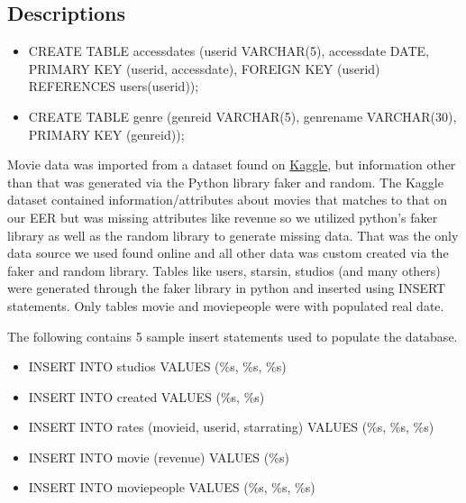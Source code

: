 \documentclass[12pt]{article}
\begin{document}

\subsection{Descriptions}

\begin{itemize}
    \item CREATE TABLE accessdates (userid VARCHAR(5), accessdate DATE, PRIMARY KEY (userid, accessdate), FOREIGN KEY (userid) REFERENCES users(userid));
    \item CREATE TABLE genre (genreid VARCHAR(5), genrename VARCHAR(30), PRIMARY KEY (genreid));
\end{itemize}



Movie data was imported from a dataset found on \href{https://www.kaggle.com/datasets/shivamb/netflix-shows}{Kaggle}, but information other than that was generated via the Python library faker and random. The Kaggle dataset contained information/attributes about movies that matches to that on our EER but was missing attributes like revenue so we utilized python's faker library as well as the random library to generate missing data. That was the only data source we used found online and all other data was custom created via the faker and random library. Tables like users, starsin, studios (and many others) were generated through the faker library in python and inserted using INSERT statements. Only tables movie and moviepeople were with populated real date.

The following contains 5 sample insert statements used to populate the database.\\

\begin{itemize}
    \item INSERT INTO studios VALUES (\%s, \%s, \%s)
    \item INSERT INTO created VALUES (\%s, \%s)
    \item INSERT INTO rates (movieid, userid, starrating) VALUES (\%s, \%s, \%s)
    \item INSERT INTO movie (revenue) VALUES (\%s)
    \item INSERT INTO moviepeople VALUES (\%s, \%s, \%s)\\
\end{itemize}
 
\end{document}
